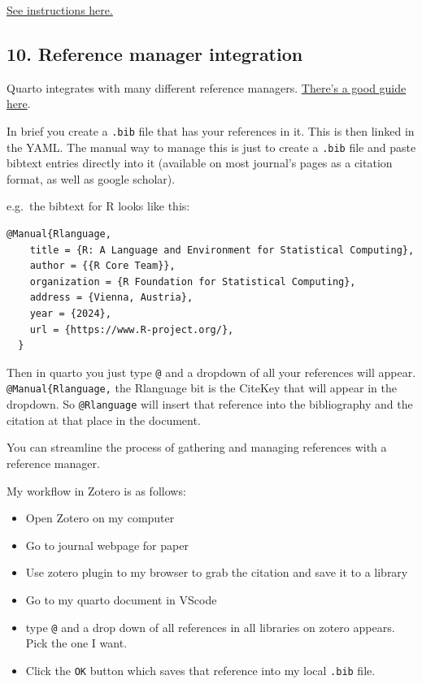 \documentclass[
  letterpaper,
  DIV=11,
  numbers=noendperiod]{scrreprt}
\providecommand{\tightlist}{%
  \setlength{\itemsep}{0pt}\setlength{\parskip}{0pt}}\usepackage{longtable,booktabs,array}
\begin{document}
\href{https://quarto.org/docs/output-formats/ms-word-templates.html}{See
instructions here.}

\subsection{10. Reference manager
integration}\label{reference-manager-integration}

Quarto integrates with many different reference managers.
\href{https://quarto.org/docs/authoring/citations.html}{There's a good
guide here}.

In brief you create a \texttt{.bib} file that has your references in it.
This is then linked in the YAML. The manual way to manage this is just
to create a \texttt{.bib} file and paste bibtext entries directly into
it (available on most journal's pages as a citation format, as well as
google scholar).

e.g.~the bibtext for R looks like this:

\begin{verbatim}
@Manual{Rlanguage,
    title = {R: A Language and Environment for Statistical Computing},
    author = {{R Core Team}},
    organization = {R Foundation for Statistical Computing},
    address = {Vienna, Austria},
    year = {2024},
    url = {https://www.R-project.org/},
  }
\end{verbatim}

Then in quarto you just type \texttt{@} and a dropdown of all your
references will appear. \texttt{@Manual\{Rlanguage,} the Rlanguage bit
is the CiteKey that will appear in the dropdown. So \texttt{@Rlanguage}
will insert that reference into the bibliography and the citation at
that place in the document.

You can streamline the process of gathering and managing references with
a reference manager.

My workflow in Zotero is as follows:

\begin{itemize}
\tightlist
\item
  Open Zotero on my computer
\item
  Go to journal webpage for paper
\item
  Use zotero plugin to my browser to grab the citation and save it to a
  library
\item
  Go to my quarto document in VScode
\item
  type \texttt{@} and a drop down of all references in all libraries on
  zotero appears. Pick the one I want.
\item
  Click the \texttt{OK} button which saves that reference into my local
  \texttt{.bib} file.
\end{itemize}
\end{document}
